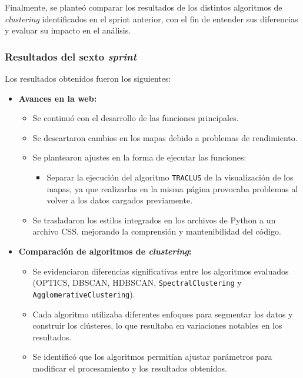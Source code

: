 Finalmente, se planteó comparar los resultados de los distintos algoritmos de \textit{clustering} identificados en el sprint anterior, con el fin de entender sus diferencias y evaluar su impacto en el análisis.

\subsubsection{Resultados del sexto \textit{sprint}}

Los resultados obtenidos fueron los siguientes:

\begin{itemize}
    \item \textbf{Avances en la web:}
        \begin{itemize}
            \item Se continuó con el desarrollo de las funciones principales.
            \item Se descartaron cambios en los mapas debido a problemas de rendimiento.
            \item Se plantearon ajustes en la forma de ejecutar las funciones:
                \begin{itemize}
                    \item Separar la ejecución del algoritmo \texttt{TRACLUS} de la visualización de los mapas, ya que realizarlas en la misma página provocaba problemas al volver a los datos cargados previamente.
                \end{itemize}
            \item Se trasladaron los estilos integrados en los archivos de Python a un archivo CSS, mejorando la comprensión y mantenibilidad del código.
        \end{itemize}
        
    \item \textbf{Comparación de algoritmos de \textit{clustering}:}
        \begin{itemize}
            \item Se evidenciaron diferencias significativas entre los algoritmos evaluados (OPTICS, DBSCAN, HDBSCAN, \texttt{SpectralClustering} y \texttt{AgglomerativeClustering}).
            \item Cada algoritmo utilizaba diferentes enfoques para segmentar los datos y construir los clústeres, lo que resultaba en variaciones notables en los resultados.
            \item Se identificó que los algoritmos permitían ajustar parámetros para modificar el procesamiento y los resultados obtenidos.
        \end{itemize}
        

\end{itemize}

